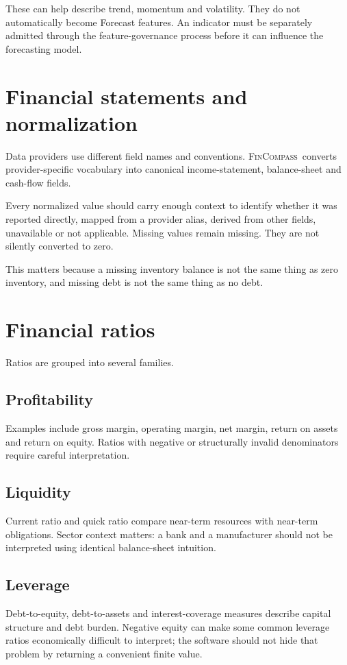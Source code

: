 \documentclass[11pt]{article}
\newcommand{\FC}{\textsc{FinCompass}}
\begin{document}
These can help describe trend, momentum and volatility. They do not automatically become Forecast features. An indicator must be separately admitted through the feature-governance process before it can influence the forecasting model.

\section{Financial statements and normalization}
Data providers use different field names and conventions. \FC\ converts provider-specific vocabulary into canonical income-statement, balance-sheet and cash-flow fields.

Every normalized value should carry enough context to identify whether it was reported directly, mapped from a provider alias, derived from other fields, unavailable or not applicable. Missing values remain missing. They are not silently converted to zero.

This matters because a missing inventory balance is not the same thing as zero inventory, and missing debt is not the same thing as no debt.

\section{Financial ratios}
Ratios are grouped into several families.

\subsection{Profitability}
Examples include gross margin, operating margin, net margin, return on assets and return on equity. Ratios with negative or structurally invalid denominators require careful interpretation.

\subsection{Liquidity}
Current ratio and quick ratio compare near-term resources with near-term obligations. Sector context matters: a bank and a manufacturer should not be interpreted using identical balance-sheet intuition.

\subsection{Leverage}
Debt-to-equity, debt-to-assets and interest-coverage measures describe capital structure and debt burden. Negative equity can make some common leverage ratios economically difficult to interpret; the software should not hide that problem by returning a convenient finite value.
\end{document}
